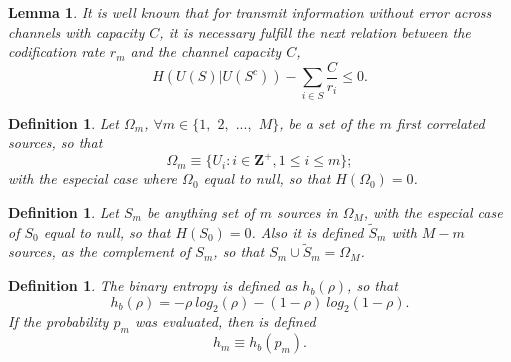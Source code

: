 \documentclass[journal]{IEEEtran}
\newtheorem{definition}[theorem]{Definition}
\newtheorem{lemma}[theorem]{Lemma}
\begin{document}
\begin{lemma}
It is well known \cite{fernando} that for transmit information without
error across channels with capacity $C$, it is necessary fulfill the next
relation between the codification rate $r_m$ and the channel capacity $C$,
\begin{equation}\label{eq:gamma5_1}
H(U(S)|U(S^c)) -\sum_{i \in S}{ \frac{C}{r_i}}  \leq  0.
\end{equation}
\end{lemma}


\begin{definition}
 \label{def:omega}
Let $\Omega_m$, $\forall m \in \{1,$ $2,$ $...,$ $M\}$, be a set of the $m$ first correlated 
sources, so that 
\begin{equation}
\label{eq:omega}
 \Omega_m \equiv \{U_i: i \in \mathbf{Z^+}, 1 \leq i \leq m\};
\end{equation}
with the especial case where $\Omega_0$ equal to null, so that $H(\Omega_0)=0$.
\end{definition}

\begin{definition}
Let $S_m$ be anything set of $m$ sources 
in $\Omega_M$, with the especial case of $S_0$ equal to null, so that $H(S_0)=0$. 
Also it is defined $\tilde{S}_m$ with $M-m$ sources, as the complement of 
$S_m$, so that $S_m \cup \tilde{S}_m = \Omega_M$.
\end{definition}

\begin{definition}
 \label{def:hb}
The binary entropy is defined as $h_b(\rho)$, so that
\begin{equation}
\label{eq:hb1}
h_b(\rho)=- \rho ~ log_2(\rho) - (1-\rho) ~ log_2(1-\rho).
\end{equation}
If the probability $p_m$ was evaluated, then is defined
\begin{equation}
\label{eq:hi}
h_m \equiv h_b(p_m).
\end{equation}
\end{definition}

 
\end{document}
